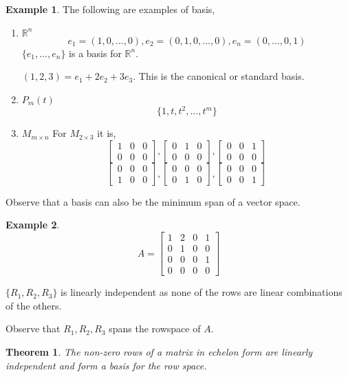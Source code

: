\documentclass{report}
\newtheorem{_thm}{Theorem}
\theoremstyle{definition}
\newtheorem{ex}{Example}
\begin{document}
\begin{ex}
The following are examples of basis,
\begin{enumerate}[1)]
 \item $\mathbb{R}^n$
 \[e_1=(1,0,...,0), e_2=(0,1,0,...,0), e_n=(0,...,0,1)\]
 $\{e_1,...,e_n\}$ is a basis for $\mathbb{R}^n$.

 $(1,2,3)=e_1+2e_2+3e_3$. This is the canonical or standard basis.
 \item $P_m(t)$
 \[\{1,t,t^2,...,t^m\}\]
 \item $M_{m\times n}$
 For $M_{2\times 3}$ it is,
 \[
 \begin{bmatrix}
 1&0&0\\0&0&0
 \end{bmatrix},
 \begin{bmatrix}
 0&1&0\\0&0&0
 \end{bmatrix},
 \begin{bmatrix}
 0&0&1\\0&0&0
 \end{bmatrix}\]
 \[
 \begin{bmatrix}
 0&0&0\\1&0&0
 \end{bmatrix},
 \begin{bmatrix}
 0&0&0\\0&1&0
 \end{bmatrix},
 \begin{bmatrix}
 0&0&0\\0&0&1
 \end{bmatrix}\]
\end{enumerate}
\end{ex}

Observe that a basis can also be the minimum span of a vector space.

\begin{ex}
\[A=
\begin{bmatrix}
1 & 2 & 0 & 1 \\
0 & 1 & 0 & 0 \\
0 & 0 & 0 & 1 \\
0 & 0 & 0 & 0
\end{bmatrix}
\]

$\{R_1, R_2, R_3\}$ is linearly independent as none of the rows are linear combinations of the others.

Observe that $R_1, R_2, R_3$ spans the rowspace of $A$.
\end{ex}

\begin{_thm}
The non-zero rows of a matrix in echelon form are linearly independent and form a basis for the row space.
\end{_thm}
\end{document}
